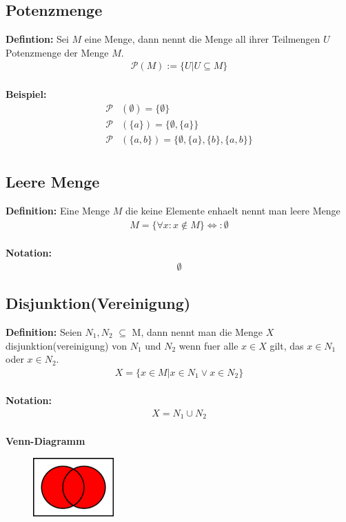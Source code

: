 \documentclass[../AbiMappe_Mathe.tex]{subfiles}
\begin{document}
\subsection{Potenzmenge}
\textbf{Defintion:} Sei $M$ eine Menge, dann nennt die Menge all ihrer Teilmengen $U$ Potenzmenge der Menge $M$.
\begin{align*}
\mathcal{P}(M) := \{U|U \subseteq M  \}
\end{align*}
\\\textbf{Beispiel:} 
\begin{align*}
\mathcal P&(\emptyset) = \{ \emptyset \}\\
\mathcal P&(\{ a \}) = \bigl\{ \emptyset, \{ a \} \bigr\}\\
\mathcal P&(\{ a, b \}) = \bigl\{ \emptyset, \{ a \}, \{ b \}, \{ a, b \} \bigr\}\\
\end{align*}

\subsection{Leere Menge}
\textbf{Definition:} Eine Menge $M$ die keine Elemente enhaelt nennt man leere Menge
\begin{align*}
M = \{\forall x:x\notin M\}  \Leftrightarrow: \emptyset
\end{align*}
\\
\textbf{Notation:}
\begin{align*}
\emptyset
\end{align*}

\subsection{Disjunktion(Vereinigung)}
\textbf{Definition:} Seien $N_1,N_2$ $\subseteq$ M, dann nennt man die Menge $X$ disjunktion(vereinigung) von $N_1$ und  $N_2$ wenn fuer alle $x \in X$ gilt, das $x \in N_1$ oder $x \in N_2$.
\begin{align*}
X=\{x \in M| x \in N_1 \lor x \in N_2 \}
\end{align*}
\\
\textbf{Notation:}
\begin{align*}
X=N_1 \cup N_2
\end{align*}
\\
\textbf{Venn-Diagramm}
\begin{figure}[H]
\centering
\includegraphics[width=117px, height=85.5px]{VennDis.png}
\end{figure}
\end{document}
